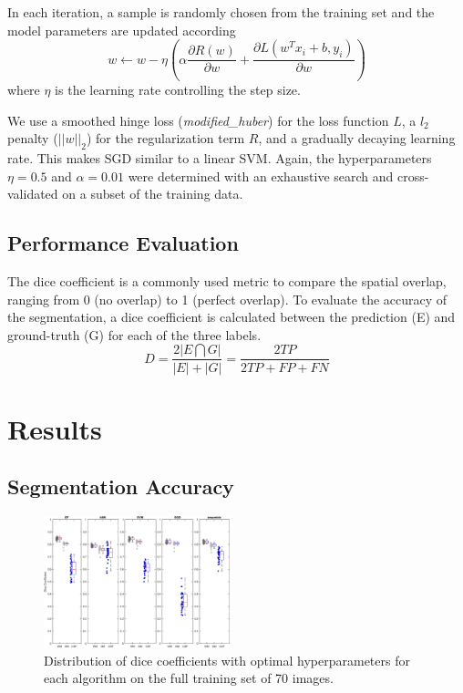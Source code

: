 \documentclass[journal]{IEEEtran}
\begin{document}
In each iteration, a sample is randomly chosen from the training set and the model parameters are updated according
\begin{equation}
w \leftarrow w - \eta \left(\alpha \frac{\partial R(w)}{\partial w} + \frac{\partial L (w^Tx_i + b, y_i)}{\partial w} \right)
\end{equation}
where $\eta$ is the learning rate controlling the step size.

We use a smoothed hinge loss (\textit{modified\_huber}) for the loss function $L$, a $l_2$ penalty ($||w||_2$) for the regularization term $R$, and a gradually decaying learning rate. This makes SGD similar to a linear SVM. Again, the hyperparameters $\eta = 0.5$ and $\alpha = 0.01$ were determined with an exhaustive search and cross-validated on a subset of the training data.


\subsection{Performance Evaluation}\label{ch.eval}
The dice coefficient is a commonly used metric to compare the spatial overlap, ranging from 0 (no overlap) to 1 (perfect overlap). To evaluate the accuracy of the segmentation, a dice coefficient is calculated between the prediction (E) and ground-truth (G) for each of the three labels. 
\begin{equation}
D = \frac{2|E \bigcap G|}{|E| + |G|} = \frac{2 TP}{2 TP + FP + FN}
\end{equation}

\section{Results}
\subsection{Segmentation Accuracy}
\begin{figure}
	\centering
	\includegraphics[width=0.48\textwidth]{images/boxplot}
	\caption{Distribution of dice coefficients with optimal hyperparameters for each algorithm on the full training set of 70 images.}\label{f.boxplot}
\end{figure}
\end{document}
